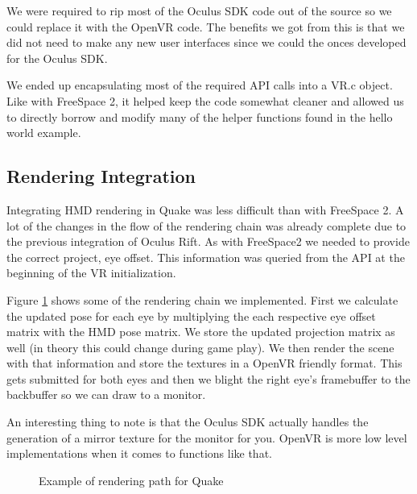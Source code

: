\documentclass[journal]{IEEEtran}
\begin{document}
We were required to rip most of the Oculus SDK code out of the source so we could replace it with the OpenVR code. The benefits we got from this is that we did not need to make any new user interfaces since we could the onces developed for the Oculus SDK.

We ended up encapsulating most of the required API calls into a VR.c object. Like with FreeSpace 2, it helped keep the code somewhat cleaner and allowed us to directly borrow and modify many of the helper functions found in the hello world example.
 
\subsection{Rendering Integration}

Integrating HMD rendering in Quake was less difficult than with FreeSpace 2. A lot of the changes in the flow of the rendering chain was already complete due to the previous integration of Oculus Rift. As with FreeSpace2 we needed to provide the correct project, eye offset. This information was queried from the API at the beginning of the VR initialization. 

Figure \ref{quake_rendering} shows some of the rendering chain we implemented. First we calculate the updated pose for each eye by multiplying the each respective eye offset matrix with the HMD pose matrix. We store the updated projection matrix as well (in theory this could change during game play). We then render the scene with that information and store the textures in a OpenVR friendly format. This gets submitted for both eyes and then we blight the right eye's framebuffer to the backbuffer so we can draw to a monitor. 

An interesting thing to note is that the Oculus SDK actually handles the generation of a mirror texture for the monitor for you. OpenVR is more low level implementations when it comes to functions like that. 

\begin{figure}[h]
	\noindent
	\centering
	\caption{Example of rendering path for Quake}\label{quake_rendering}
\end{figure}
\end{document}

